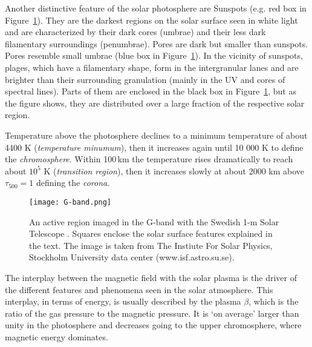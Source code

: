 \documentclass[goettingen, gauss, print]{thesis}
\begin{document}
Another distinctive feature of the solar photosphere are Sunspots (e.g. red box in Figure~\ref{G-band}). They are the darkest regions on the solar surface seen in white light and are characterized by their dark cores (umbrae) and their less dark filamentary surroundings (penumbrae). Pores are dark but smaller than sunspots. Pores resemble small umbrae (blue box in Figure~\ref{G-band}). In the vicinity of sunspots, plages, which have a filamentary shape, form in the intergranular lanes and are brighter than their surrounding granulation (mainly in the UV and cores of spectral lines). Parts of them are enclosed in the black box in Figure~\ref{G-band}, but as the figure shows, they are distributed over a large fraction of the respective solar region. 

Temperature above the photosphere declines to a minimum temperature of about 4400 K (\textit{temperature minumum}), then it increases again until 10 000 K to define the \textit{chromosphere}. Within 100\,km the temperature rises dramatically to reach about $10^5$ K (\textit{transition region}), then it increases slowly at about 2000 km above $\tau_{500} = 1$ defining the \textit{corona}. 

\begin{figure}
\centering
\texttt{[image: G-band.png]}
\caption{An active region imaged in the G-band with the Swedish 1-m Solar Telescope \citep[SST,][]{scharmer_1-meter_2003}. Squares enclose the solar surface features explained in the text. The image is taken from The Instiute For Solar Physics, Stockholm University data center (www.isf.astro.su.se).} 
\label{G-band}
\end{figure}



%
The interplay between the magnetic field with the solar plasma is the driver of the different features and phenomena seen in the solar atmosphere. This interplay, in terms of energy, is usually described by the plasma $\beta$, which is the ratio of the gas pressure to the magnetic pressure. It is `on average' larger than unity in the photosphere and decreases going to the upper chromosphere, where magnetic energy dominates. 
\end{document}
